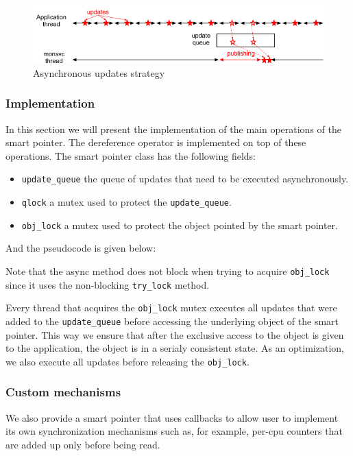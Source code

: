 \begin{figure}[ht!]
\centering
\includegraphics[scale=0.6]{Images/async_after.png}
\caption{Asynchronous updates strategy}
\label{fig:async_ptr}
\end{figure}

\subsubsection*{Implementation}

In this section we will present the implementation of the main operations of the smart pointer. The dereference operator is implemented on top of these operations. The smart pointer class has the following fields:
\begin{itemize}
\item {\tt update\_queue} the queue of updates that need to be executed asynchronously.
\item {\tt qlock} a mutex used to protect the {\tt update\_queue}.
\item {\tt obj\_lock} a mutex used to protect the object pointed by the smart pointer.
\end{itemize}
And the pseudocode is given below:

Note that the async method does not block when trying to acquire {\tt obj\_lock} since it uses the non-blocking {\tt try\_lock} method. 

Every thread that acquires the {\tt obj\_lock} mutex executes all updates that were added to the {\tt update\_queue} before accessing the underlying object of the smart pointer. This way we ensure that after the exclusive access to the object is given to the application, the object is in a serialy consistent state. As an optimization, we also execute all updates before releasing the {\tt obj\_lock}.

\subsubsection*{Custom mechanisms}

We also provide a smart pointer that uses callbacks to allow user to implement its own synchronization mechanisms such as, for example, per-cpu counters that are added up only before being read.

